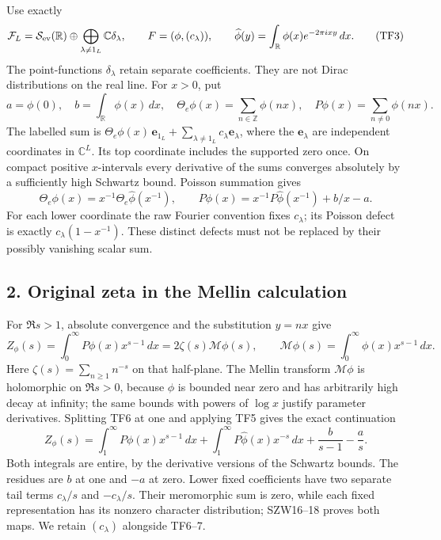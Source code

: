\documentclass[
  10pt,
  a4paper,
]{article}
\begin{document}
Use exactly \[
\mathcal F_L=\mathcal S_{\rm ev}(\mathbb R)\oplus
\bigoplus_{\lambda\ne1_L}\mathbb C\delta_\lambda,
\qquad F=(\phi,(c_\lambda)),
\qquad \widehat\phi(y)=\int_{\mathbb R}\phi(x)e^{-2\pi ixy}\,dx.
\tag{TF3}
\] The point-functions \(\delta_\lambda\) retain separate coefficients.
They are not Dirac distributions on the real line. For \(x>0\), put \[
a=\phi(0),\quad b=\int_{\mathbb R}\phi(x)\,dx,\quad
\Theta_e\phi(x)=\sum_{n\in\mathbb Z}\phi(nx),\quad
P\phi(x)=\sum_{n\ne0}\phi(nx).
\tag{TF4}
\] The labelled sum is
\(\Theta_e\phi(x)\,\mathbf e_{1_L}+\sum_{\lambda\ne1_L}c_\lambda\mathbf e_\lambda\),
where the \(\mathbf e_\lambda\) are independent coordinates in
\(\mathbb C^L\). Its top coordinate includes the supported zero once. On
compact positive \(x\)-intervals every derivative of the sums converges
absolutely by a sufficiently high Schwartz bound. Poisson summation
gives \[
\Theta_e\phi(x)=x^{-1}\Theta_e\widehat\phi(x^{-1}),\qquad
P\phi(x)=x^{-1}P\widehat\phi(x^{-1})+b/x-a.
\tag{TF5}
\] For each lower coordinate the raw Fourier convention fixes
\(c_\lambda\); its Poisson defect is exactly \(c_\lambda(1-x^{-1})\).
These distinct defects must not be replaced by their possibly vanishing
scalar sum.

\subsection{2. Original zeta in the Mellin
calculation}\label{original-zeta-in-the-mellin-calculation}

For \(\Re s>1\), absolute convergence and the substitution \(y=nx\) give
\[
Z_\phi(s)=\int_0^\infty P\phi(x)x^{s-1}\,dx
=2\zeta(s)\mathcal M\phi(s),\qquad
\mathcal M\phi(s)=\int_0^\infty\phi(x)x^{s-1}\,dx.
\tag{TF6}
\] Here \(\zeta(s)=\sum_{n\ge1}n^{-s}\) on that half-plane. The Mellin
transform \(\mathcal M\phi\) is holomorphic on \(\Re s>0\), because
\(\phi\) is bounded near zero and has arbitrarily high decay at
infinity; the same bounds with powers of \(\log x\) justify parameter
derivatives. Splitting TF6 at one and applying TF5 gives the exact
continuation \[
Z_\phi(s)=\int_1^\infty P\phi(x)x^{s-1}\,dx
+\int_1^\infty P\widehat\phi(x)x^{-s}\,dx
+\frac{b}{s-1}-\frac{a}{s}.
\tag{TF7}
\] Both integrals are entire, by the derivative versions of the Schwartz
bounds. The residues are \(b\) at one and \(-a\) at zero. Lower fixed
coefficients have two separate tail terms \(c_\lambda/s\) and
\(-c_\lambda/s\). Their meromorphic sum is zero, while each fixed
representation has its nonzero character distribution; SZW16--18 proves
both maps. We retain \((c_\lambda)\) alongside TF6--7.
\end{document}
